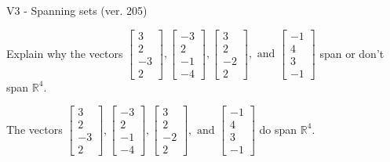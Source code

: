 \begin{exercise}
  \begin{exerciseTitle}V3 - Spanning sets (ver. 205)\end{exerciseTitle}
  \begin{exerciseStatement}
    Explain why the vectors \(\left[\begin{array}{r}
3 \\
2 \\
-3 \\
2
\end{array}\right] , \left[\begin{array}{r}
-3 \\
2 \\
-1 \\
-4
\end{array}\right] , \left[\begin{array}{r}
3 \\
2 \\
-2 \\
2
\end{array}\right] , \text{ and } \left[\begin{array}{r}
-1 \\
4 \\
3 \\
-1
\end{array}\right]\) span or don't span \(\mathbb{R}^4\). 
	


  \end{exerciseStatement}
  \begin{exerciseAnswer}
   The vectors \(\left[\begin{array}{r}
3 \\
2 \\
-3 \\
2
\end{array}\right] , \left[\begin{array}{r}
-3 \\
2 \\
-1 \\
-4
\end{array}\right] , \left[\begin{array}{r}
3 \\
2 \\
-2 \\
2
\end{array}\right] , \text{ and } \left[\begin{array}{r}
-1 \\
4 \\
3 \\
-1
\end{array}\right]\) 
  	 do  
	span \(\mathbb{R}^4\).
  


  \end{exerciseAnswer}
\end{exercise}